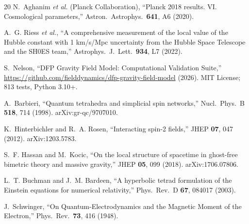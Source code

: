 \documentclass[aps,prd,preprint,superscriptaddress,showpacs,preprintnumbers,amsmath,amssymb,nofootinbib]{revtex4-2}
\begin{document}
\begin{thebibliography}{20}
N.~Aghanim \textit{et al.} (Planck Collaboration), ``Planck 2018 results. VI. Cosmological parameters,'' Astron.\ Astrophys.\ \textbf{641}, A6 (2020).

A.~G. Riess \textit{et al.}, ``A comprehensive measurement of the local value of the Hubble constant with 1 km/s/Mpc uncertainty from the Hubble Space Telescope and the SH0ES team,'' Astrophys.\ J.\ Lett.\ \textbf{934}, L7 (2022).

S.~Nelson, ``DFP Gravity Field Model: Computational Validation Suite,'' \url{https://github.com/fielddynamics/dfp-gravity-field-model} (2026). MIT License; 813 tests, Python 3.10+.

A.~Barbieri, ``Quantum tetrahedra and simplicial spin networks,'' Nucl.\ Phys.\ B \textbf{518}, 714 (1998). arXiv:gr-qc/9707010.

K.~Hinterbichler and R.~A. Rosen, ``Interacting spin-2 fields,'' JHEP \textbf{07}, 047 (2012). arXiv:1203.5783.

S.~F. Hassan and M.~Kocic, ``On the local structure of spacetime in ghost-free bimetric theory and massive gravity,'' JHEP \textbf{05}, 099 (2018). arXiv:1706.07806.

L.~T. Buchman and J.~M. Bardeen, ``A hyperbolic tetrad formulation of the Einstein equations for numerical relativity,'' Phys.\ Rev.\ D \textbf{67}, 084017 (2003).

J.~Schwinger, ``On Quantum-Electrodynamics and the Magnetic Moment of the Electron,'' Phys.\ Rev.\ \textbf{73}, 416 (1948).

\end{thebibliography}
\end{document}
